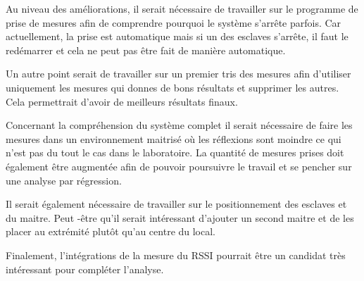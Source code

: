 Au niveau des améliorations, il serait nécessaire de travailler sur le programme de prise de mesures afin de comprendre pourquoi le système s'arrête parfois. Car actuellement, la prise est automatique mais si un des esclaves s'arrête, il faut le redémarrer et cela ne peut pas être fait de manière automatique. 

Un autre point serait de travailler sur un premier tris des mesures afin d'utiliser uniquement les mesures qui donnes de bons résultats et supprimer les autres. Cela permettrait d'avoir de meilleurs résultats finaux. 

Concernant la compréhension du système complet il serait nécessaire de faire les mesures dans un environnement maitrisé où les réflexions sont moindre ce qui n'est pas du tout le cas dans le laboratoire. La quantité de mesures prises doit également être augmentée afin de pouvoir poursuivre le travail et se pencher sur une analyse par régression. 

Il serait également nécessaire de travailler sur le positionnement des esclaves et du maitre. Peut -être qu'il serait intéressant d'ajouter un second maitre et de les placer au extrémité plutôt qu'au centre du local. 

Finalement, l'intégrations de la mesure du RSSI pourrait être un candidat très intéressant pour compléter l'analyse. 







